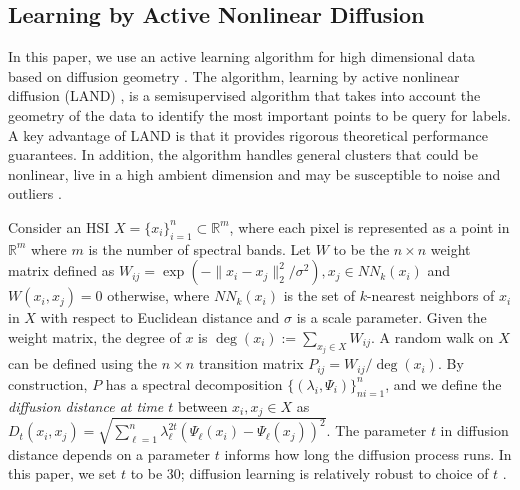 \documentclass{article}
\def\R{{\mathbb R}}
\begin{document}
\subsection{Learning by Active Nonlinear Diffusion}
In this paper, we use an active learning algorithm for high dimensional data based on diffusion geometry \cite{Murphy2019_Unsupervised, Maggioni2019_LUND, Murphy2020_Spectral}. The algorithm, learning by active nonlinear diffusion (LAND) \cite{Maggioni2019_LAND}, is a semisupervised algorithm that takes into account the geometry of the data to identify the most important points to be query for labels. A key advantage of LAND is that it provides rigorous theoretical performance guarantees. In addition, the algorithm handles general clusters that could be nonlinear, live in a high ambient dimension and may be susceptible to noise and outliers \cite{Maggioni2019_LAND}.

Consider an HSI $X=\{x_{i}\}_{i=1}^{n}\subset\mathbb{R}^{m}$, where each pixel is represented as a point in $\R^{m}$ where $m$ is the number of spectral bands. Let $W$ to be the $n\times n$ weight matrix defined as $W_{ij}=\exp(-\|x_{i}-x_{j}\|_{2}^{2}/\sigma^{2}), x_{j}\in NN_{k}(x_{i})$ and $W(x_{i},x_{j})=0$ otherwise, where $NN_{k}(x_{i})$ is the set of $k$-nearest neighbors of $x_{i}$ in $X$ with respect to Euclidean distance and $\sigma$ is a scale parameter. Given the weight matrix, the degree of $x$ is $\deg(x_{i}):=\sum_{x_{j}\in X}W_{ij}$. A random walk on $X$ can be defined using the $n\times n$ transition matrix $P_{ij}={W_{ij}}\big/{\deg(x_{i})}.$  
By construction, $P$ has a spectral decomposition $\{(\lambda_{i},\Psi_{i})\}_{ni=1}^{n}$, and we define the \emph{diffusion distance at time $t$} between $x_{i},x_{j}\in X$ as $D_{t}(x_{i},x_{j})=\sqrt{\sum\nolimits_{\ell=1}^{n}\lambda_{\ell}^{2t}(\Psi_{\ell}(x_{i})-\Psi_{\ell}(x_{j}))^{2}}$.  The parameter $t$ in diffusion distance depends on a parameter $t$ informs how long the diffusion process runs.  In this paper, we set $t$ to be 30; diffusion learning is relatively robust to choice of $t$ \cite{Murphy2019_Unsupervised}. 
\end{document}
